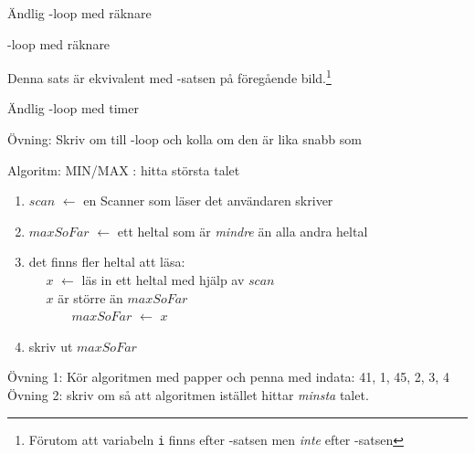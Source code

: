 \documentclass{lecturenotes}
\begin{document}
\begin{Slide}{Ändlig -loop med räknare}

\end{Slide}


\begin{Slide}{-loop med räknare}

Denna sats är ekvivalent med -satsen på föregående bild.\footnote{\scriptsize Förutom att variabeln \texttt{i} finns efter -satsen men \textit{inte} efter -satsen }
\end{Slide}

\begin{Slide}{Ändlig -loop med timer}

\scriptsize 
Övning: Skriv om till -loop och kolla om den är lika snabb som 
\end{Slide}

\begin{Slide}{Algoritm: MIN/MAX}
: hitta största talet \\ \vspace{1em}
\begin{enumerate}
\item $scan$ $\leftarrow$ en Scanner som läser det användaren skriver
\item $maxSoFar$ $\leftarrow$ ett heltal som är \textit{mindre} än alla andra heltal
\item  {} det finns fler heltal att läsa: \\
~~ $x$ $\leftarrow$ läs in ett heltal med hjälp av $scan$ \\
~~  $x$ är större än $maxSoFar$ \\
~~~~~~ $maxSoFar$ $\leftarrow$ $x$
\item skriv ut $maxSoFar$ 
\end{enumerate}
\vspace{1em} \scriptsize 
Övning 1: Kör algoritmen med papper och penna med indata: 41, 1, 45, 2, 3, 4 \\ 
Övning 2: skriv om så att algoritmen istället hittar \textit{minsta} talet.
\end{Slide}
\end{document}
